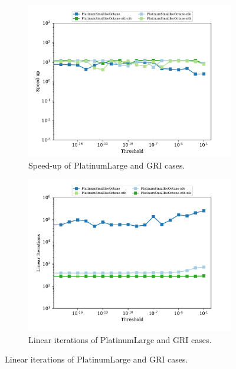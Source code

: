 \documentclass{article}
\begin{document}
\begin{figure}[htb]
    \centering
    \begin{subfigure}{0.49\textwidth}
        \centering
        \includegraphics[width=\textwidth]{figures/speedup-isooctane-small-network_combustor_exhaust.pdf}
        \caption{Speed-up of PlatinumLarge and GRI cases.}
        \label{fig:isooctane_small_su}
    \end{subfigure}
    \hfill
    \begin{subfigure}{0.49\textwidth}
        \centering
        \includegraphics[width=\textwidth]{figures/lin_iters_isooctane_small.pdf}
        \caption{Linear iterations of PlatinumLarge and GRI cases.}
        \label{fig:isooctane_small_cond}
    \end{subfigure}
    \hfill


\end{figure}
\end{document}
